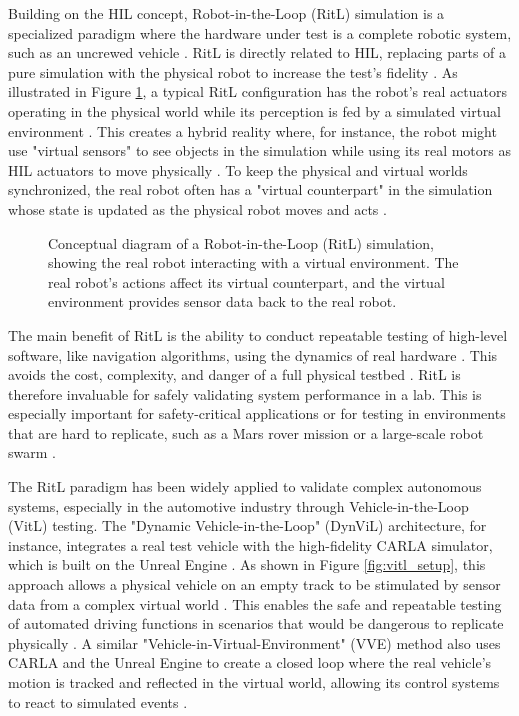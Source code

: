 Building on the HIL concept, Robot-in-the-Loop (RitL) simulation is a specialized paradigm where the hardware under test is a complete robotic system, such as an uncrewed vehicle \cite{Mihalic2022}. RitL is directly related to HIL, replacing parts of a pure simulation with the physical robot to increase the test's fidelity \cite{Hu05}. As illustrated in Figure \ref{fig:ritl_concept}, a typical RitL configuration has the robot's real actuators operating in the physical world while its perception is fed by a simulated virtual environment \cite{Hu05, Mihalic2022}. This creates a hybrid reality where, for instance, the robot might use "virtual sensors" to see objects in the simulation while using its real motors as HIL actuators to move physically \cite{Hu05}. To keep the physical and virtual worlds synchronized, the real robot often has a "virtual counterpart" in the simulation whose state is updated as the physical robot moves and acts \cite{Hu05}.

\begin{figure}[h]
\centering
\caption{Conceptual diagram of a Robot-in-the-Loop (RitL) simulation, showing the real robot interacting with a virtual environment. The real robot's actions affect its virtual counterpart, and the virtual environment provides sensor data back to the real robot.}
\label{fig:ritl_concept}
\end{figure}

The main benefit of RitL is the ability to conduct repeatable testing of high-level software, like navigation algorithms, using the dynamics of real hardware \cite{Mihalic2022}. This avoids the cost, complexity, and danger of a full physical testbed \cite{Mihalic2022}. RitL is therefore invaluable for safely validating system performance in a lab. This is especially important for safety-critical applications or for testing in environments that are hard to replicate, such as a Mars rover mission or a large-scale robot swarm \cite{Hu05, Mihalic2022}.



The RitL paradigm has been widely applied to validate complex autonomous systems, especially in the automotive industry through Vehicle-in-the-Loop (VitL) testing. The "Dynamic Vehicle-in-the-Loop" (DynViL) architecture, for instance, integrates a real test vehicle with the high-fidelity CARLA simulator, which is built on the Unreal Engine \cite{DSR22}. As shown in Figure \ref{fig:vitl_setup}, this approach allows a physical vehicle on an empty track to be stimulated by sensor data from a complex virtual world \cite{DSR22}. This enables the safe and repeatable testing of automated driving functions in scenarios that would be dangerous to replicate physically \cite{DSR22}. A similar "Vehicle-in-Virtual-Environment" (VVE) method also uses CARLA and the Unreal Engine to create a closed loop where the real vehicle's motion is tracked and reflected in the virtual world, allowing its control systems to react to simulated events \cite{Cao2023}.

